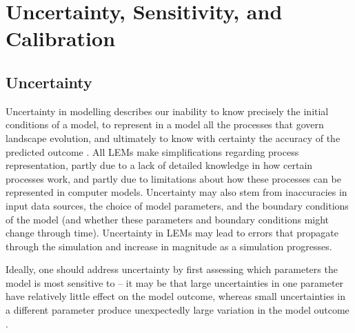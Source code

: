 %
%

\section{Uncertainty, Sensitivity, and Calibration}

\subsection{Uncertainty}
Uncertainty in modelling describes our inability to know precisely the initial conditions of a model, to represent in a model all the processes that govern landscape evolution, and ultimately to know with certainty the accuracy of the predicted outcome \citep{Beven1996,pelletier2015forecasting}. All LEMs make simplifications regarding process representation, partly due to a lack of detailed knowledge in how certain processes work, and partly due to limitations about how these processes can be represented in computer models.  Uncertainty may also stem from inaccuracies in input data sources, the choice of model parameters, and the boundary conditions of the model (and whether these parameters and boundary conditions might change through time). Uncertainty in LEMs may lead to errors that propagate through the simulation and increase in magnitude as a simulation progresses. 

Ideally, one should address uncertainty by first assessing which parameters the model is most sensitive to -- it may be that large uncertainties in one parameter have relatively little effect on the model outcome, whereas small uncertainties in a different parameter produce unexpectedly large variation in the model outcome \citep{pelletier2015forecasting}.

